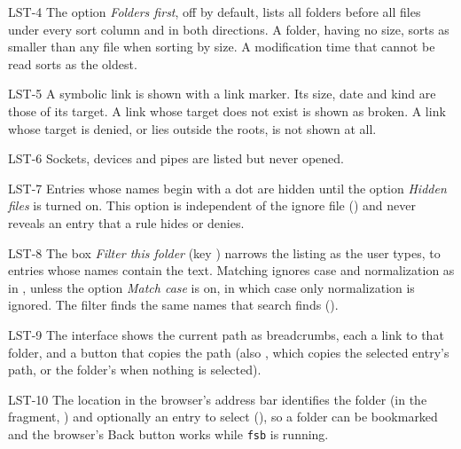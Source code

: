\begin{req}{LST-4}
The option \emph{Folders first}, off by default, lists all folders before all files
under every sort column and in both directions.  A folder, having no size, sorts as
smaller than any file when sorting by size.  A modification time that cannot be read
sorts as the oldest.
\end{req}

\begin{req}{LST-5}
A symbolic link is shown with a link marker.  Its size, date and kind are those of
its target.  A link whose target does not exist is shown as broken.  A link whose
target is denied, or lies outside the roots, is not shown at all.
\end{req}

\begin{req}{LST-6}
Sockets, devices and pipes are listed but never opened.
\end{req}

\begin{req}{LST-7}
Entries whose names begin with a dot are hidden until the option \emph{Hidden files}
is turned on.  This option is independent of the ignore file () and never
reveals an entry that a rule hides or denies.
\end{req}

\begin{req}{LST-8}
The box \emph{Filter this folder} (key \code{/}) narrows the listing as the user
types, to entries whose names contain the text.  Matching ignores case and
normalization as in , unless the option \emph{Match case} is on, in which
case only normalization is ignored.  The filter finds the same names that search
finds ().
\end{req}

\begin{req}{LST-9}
The interface shows the current path as breadcrumbs, each a link to that folder,
and a button that copies the path (also , which copies the selected
entry's path, or the folder's when nothing is selected).
\end{req}

\begin{req}{LST-10}
The location in the browser's address bar identifies the folder (in the fragment,
) and optionally an entry to select
(), so a folder can be bookmarked and the browser's Back button
works while \texttt{fsb} is running.
\end{req}

